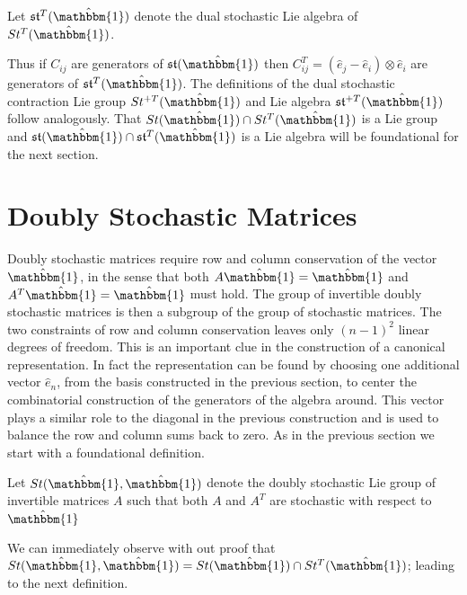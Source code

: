 \begin{definition}
	Let $\mathfrak{st}^T(\hat{\mathbbm{1}})$ denote the dual stochastic Lie 
	algebra of $St^T(\hat{\mathbbm{1}})$.
\end{definition}

Thus if $C_{ij}$ are generators of $\mathfrak{st}(\hat{\mathbbm{1}})$ then $C_{ij}^T = \left(\hat{e}_j - \hat{e}_i \right) \otimes \hat{e}_i$
are generators of $\mathfrak{st}^T(\hat{\mathbbm{1}})$. The definitions of the
dual stochastic contraction Lie group $St^{+T}(\hat{\mathbbm{1}})$ and Lie algebra $\mathfrak{st}^{+T}(\hat{\mathbbm{1}})$
follow analogously. That $St(\hat{\mathbbm{1}}) \cap St^T(\hat{\mathbbm{1}})$ 
is a Lie group and $\mathfrak{st}(\hat{\mathbbm{1}}) \cap \mathfrak{st}^T(\hat{\mathbbm{1}})$ 
is a Lie algebra will be foundational for the next section.

\section{Doubly Stochastic Matrices}
Doubly stochastic matrices require row and column conservation of the vector $\hat{\mathbbm{1}}$, 
in the sense that both $A \hat{\mathbbm{1}} = \hat{\mathbbm{1}}$ and $A^T \hat{\mathbbm{1}} = \hat{\mathbbm{1}}$ 
must hold. The group of invertible doubly stochastic matrices is then a subgroup
of the group of stochastic matrices. The two constraints of row and column 
conservation leaves only $\left(n - 1\right)^2$ linear degrees of freedom. This 
is an important clue in the construction of a canonical representation. In fact 
the representation can be found by choosing one additional vector $\hat{e}_n$, 
from the basis constructed in the previous section, to center the combinatorial 
construction of the generators of the algebra around. This vector plays a 
similar role to the diagonal in the previous construction and is used to balance 
the row and column sums back to zero. As in the previous section we start with 
a foundational definition.

\begin{definition}
	Let $St(\hat{\mathbbm{1}}, \hat{\mathbbm{1}})$ denote the doubly stochastic 
	Lie group of invertible matrices $A$ such that both $A$ and $A^T$ are 
	stochastic with respect to $\hat{\mathbbm{1}}$
\end{definition}

We can immediately observe with out proof that $St(\hat{\mathbbm{1}}, \hat{\mathbbm{1}}) = St(\hat{\mathbbm{1}}) \cap St^T(\hat{\mathbbm{1}})$;
leading to the next definition.

